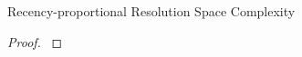 \begin{theorem}{Recency-proportional Resolution Space Complexity}
\label{thm:recency-proportional-resolution-algo-space-complexity}

\end{theorem}

\begin{proof}
\label{prf:recency-proportional-resolution-algo-space-complexity}

\end{proof}
